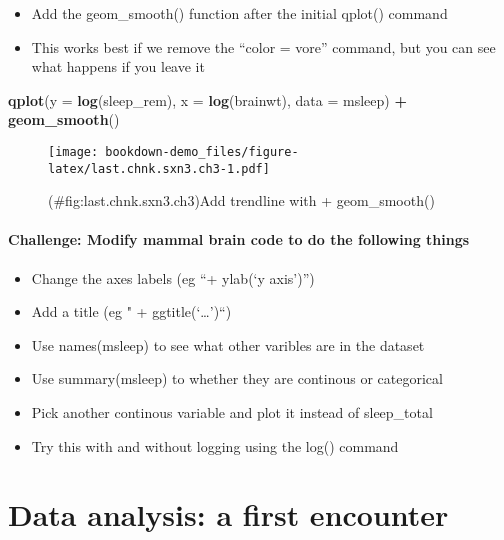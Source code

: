 \documentclass[]{book}
\newenvironment{Shaded}{\begin{snugshade}}{\end{snugshade}}
\newcommand{\KeywordTok}[1]{\textcolor[rgb]{0.13,0.29,0.53}{\textbf{#1}}}
\newcommand{\DataTypeTok}[1]{\textcolor[rgb]{0.13,0.29,0.53}{#1}}
\newcommand{\StringTok}[1]{\textcolor[rgb]{0.31,0.60,0.02}{#1}}
\newcommand{\OperatorTok}[1]{\textcolor[rgb]{0.81,0.36,0.00}{\textbf{#1}}}
\newcommand{\NormalTok}[1]{#1}
\providecommand{\tightlist}{%
  \setlength{\itemsep}{0pt}\setlength{\parskip}{0pt}}
\theoremstyle{definition}
\theoremstyle{definition}
\theoremstyle{definition}
\theoremstyle{remark}
\begin{document}
\begin{itemize}
\tightlist
\item
  Add the geom\_smooth() function after the initial qplot() command
\item
  This works best if we remove the ``color = vore'' command, but you can
  see what happens if you leave it
\end{itemize}

\begin{Shaded}
\begin{Highlighting}[]
\KeywordTok{qplot}\NormalTok{(}\DataTypeTok{y =} \KeywordTok{log}\NormalTok{(sleep_rem),}
      \DataTypeTok{x =} \KeywordTok{log}\NormalTok{(brainwt), }
      \DataTypeTok{data =}\NormalTok{ msleep) }\OperatorTok{+}
\StringTok{  }\KeywordTok{geom_smooth}\NormalTok{()}
\end{Highlighting}
\end{Shaded}

\begin{figure}
\centering
\texttt{[image: bookdown-demo\_files/figure-latex/last.chnk.sxn3.ch3-1.pdf]}
\caption{(\#fig:last.chnk.sxn3.ch3)Add trendline with + geom\_smooth()}
\end{figure}

\subsection{Challenge: Modify mammal brain code to do the following
things}\label{challenge-modify-mammal-brain-code-to-do-the-following-things}

\begin{itemize}
\tightlist
\item
  Change the axes labels (eg ``+ ylab(`y axis')'')
\item
  Add a title (eg " + ggtitle(`\ldots{}')``)
\item
  Use names(msleep) to see what other varibles are in the dataset
\item
  Use summary(msleep) to whether they are continous or categorical
\item
  Pick another continous variable and plot it instead of sleep\_total
\item
  Try this with and without logging using the log() command
\end{itemize}

\part{Data analysis: a first
encounter}\label{part-data-analysis-a-first-encounter}
\end{document}
